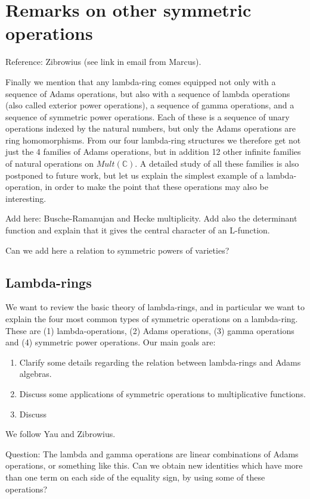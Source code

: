 
\section{Remarks on other symmetric operations}

Reference: Zibrowius (see link in email from Marcus). 

Finally we mention that any lambda-ring comes equipped not only with a sequence of Adams operations, but also with a sequence of lambda operations (also called exterior power operations), a sequence of gamma operations, and a sequence of symmetric power operations. Each of these is a sequence of unary operations indexed by the natural numbers, but only the Adams operations are ring homomorphisms. From our four lambda-ring structures we therefore get not just the 4 families of Adams operations, but in addition 12 other infinite families of natural operations on $Mult(\mathbb{C})$. A detailed study of all these families is also postponed to future work, but let us explain the simplest example of a lambda-operation, in order to make the point that these operations may also be interesting.

Add here: Busche-Ramanujan and Hecke multiplicity. Add also the determinant function and explain that it gives the central character of an L-function.

Can we add here a relation to symmetric powers of varieties?


\subsection{Lambda-rings}

We want to review the basic theory of lambda-rings, and in particular we want to explain the four most common types of symmetric operations on a lambda-ring. These are (1) lambda-operations, (2) Adams operations, (3) gamma operations and (4) symmetric power operations. Our main goals are:
\begin{enumerate}
\item Clarify some details regarding the relation between lambda-rings and Adams algebras.
\item Discuss some applications of symmetric operations to multiplicative functions.
\item Discuss
\end{enumerate}
We follow Yau and Zibrowius.




Question: The lambda and gamma operations are linear combinations of Adams operations, or something like this. Can we obtain new identities which have more than one term on each side of the equality sign, by using some of these operations?


